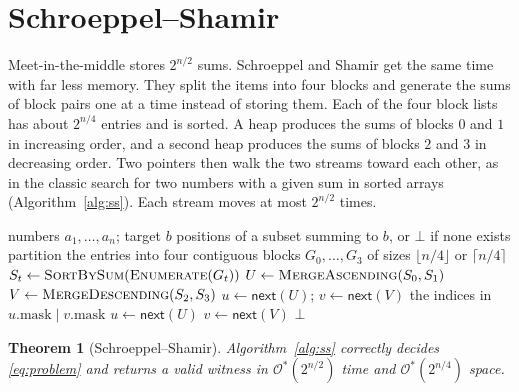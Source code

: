 \documentclass[conference]{IEEEtran}
\newtheorem{theorem}{Theorem}
\newcommand{\Oh}{\mathcal{O}}
\begin{document}
\section{Schroeppel--Shamir}\label{sec:ss}
Meet-in-the-middle stores $2^{n/2}$ sums. Schroeppel and Shamir get the same
time with far less memory. They split the items into four blocks and generate
the sums of block pairs one at a time instead of storing them. Each of the four
block lists has about $2^{n/4}$ entries and is sorted. A heap produces the sums
of blocks $0$ and $1$ in increasing order, and a second heap produces the sums
of blocks $2$ and $3$ in decreasing order. Two pointers then walk the two
streams toward each other, as in the classic search for two numbers with a
given sum in sorted arrays (Algorithm~\ref{alg:ss}). Each stream moves at most
$2^{n/2}$ times.

\begin{algorithm}[t]
\caption{Schroeppel--Shamir with streamed pair sums}
\label{alg:ss}
\begin{algorithmic}[1]
\Require numbers $a_1,\dots,a_n$; target $b$
\Ensure positions of a subset summing to $b$, or $\bot$ if none exists
\State partition the entries into four contiguous blocks $G_0,\dots,G_3$ of sizes $\lfloor n/4\rfloor$ or $\lceil n/4\rceil$
   \State $S_t \gets \textsc{SortBySum}(\textsc{Enumerate}(G_t))$ 
\EndFor
\State $U \gets \textsc{MergeAscending}(S_0,S_1)$ 
\State $V \gets \textsc{MergeDescending}(S_2,S_3)$ 
\State $u\gets \textsf{next}(U)$; \quad $v\gets \textsf{next}(V)$
      \State \Return the indices in $u.\mathrm{mask}\mid v.\mathrm{mask}$
      \State $u\gets \textsf{next}(U)$
   \Else
      \State $v\gets \textsf{next}(V)$
   \EndIf
\EndWhile
\State \Return $\bot$
\end{algorithmic}
\end{algorithm}

\begin{theorem}[Schroeppel--Shamir]\label{thm:ss}
Algorithm~\ref{alg:ss} correctly decides \eqref{eq:problem} and returns a valid
witness in $\Oh^*(2^{n/2})$ time and $\Oh^*(2^{n/4})$ space.
\end{theorem}
\end{document}
